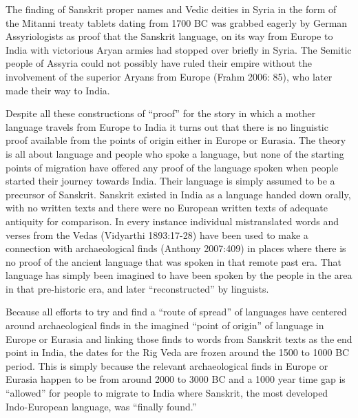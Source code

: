 The finding of Sanskrit proper names and Vedic deities in Syria in the form of the Mitanni treaty tablets dating from 1700 BC was grabbed eagerly by German Assyriologists as proof that the Sanskrit language, on its way from Europe to India with victorious Aryan armies had stopped over briefly in Syria. The Semitic people of Assyria could not possibly have ruled their empire without the involvement of the superior Aryans from Europe (Frahm 2006: 85), who later made their way to India.

Despite all these constructions of “proof” for the story in which a mother language travels from Europe to India it turns out that there is no linguistic proof available from the points of origin either in Europe or Eurasia. The theory is all about language and people who spoke a language, but none of the starting points of migration have offered any proof of the language spoken when people started their journey towards India. Their language is simply assumed to be a precursor of Sanskrit. Sanskrit existed in India as a language handed down orally, with no written texts and there were no European written texts of adequate antiquity for comparison. In every instance individual mistranslated words and verses from the Vedas (Vidyarthi 1893:17-28) have been used to make a connection with archaeological finds (Anthony 2007:409) in places where there is no proof of the ancient language that was spoken in that remote past era. That language has simply been imagined to have been spoken by the people in the area in that pre-historic era, and later “reconstructed” by linguists.

Because all efforts to try and find a “route of spread” of languages have centered around archaeological finds in the imagined “point of origin” of language in Europe or Eurasia and linking those finds to words from Sanskrit texts as the end point in India, the dates for the Rig Veda are frozen around the 1500 to 1000 BC period. This is simply because the relevant archaeological finds in Europe or Eurasia happen to be from around 2000 to 3000 BC and a 1000 year time gap is “allowed” for people to migrate to India where Sanskrit, the most developed Indo-European language, was “finally found.”

